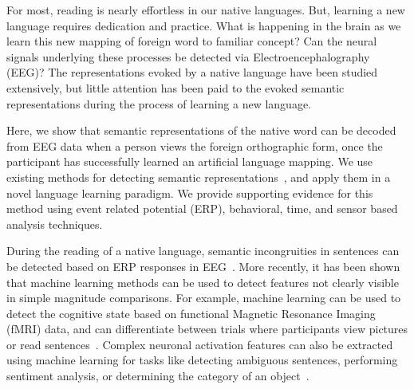 \label{chapter:introduction}

For most, reading is nearly effortless in our native languages.  But, learning a new language requires dedication and practice.  What is happening in the brain as we learn this new mapping of foreign word to familiar concept?  Can the neural signals underlying these processes be detected via Electroencephalography (EEG)?  The representations evoked by a native language have been studied extensively, but little attention has been paid to the evoked semantic representations during the process of learning a new language.
  

Here, we show that semantic representations of the native word can be decoded from EEG data when a person views the foreign orthographic form, once the participant has successfully learned an artificial language mapping. We use existing methods for detecting semantic representations~\cite{Sudre2012}, and apply them in a novel language learning paradigm. We provide supporting evidence for this method using event related potential (ERP), behavioral, time, and sensor based analysis techniques.

During the reading of a native language, semantic incongruities in sentences can be detected based on ERP responses in EEG~\cite{kutas1980reading,kuperberg2007neural}. More recently, it has been shown that machine learning methods can be used to detect features not clearly visible in simple magnitude comparisons. For example, machine learning can be used to detect the cognitive state based on functional Magnetic Resonance Imaging (fMRI)  data, and can differentiate between trials where participants  view pictures or read sentences~\cite{Wang2002}. Complex neuronal activation features can also be extracted using machine learning for tasks like detecting ambiguous sentences, performing sentiment analysis, or determining the category of an object~\cite{Mitchell2002,Shinkareva2008,Gu2014}.

